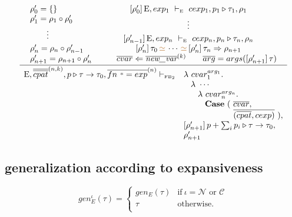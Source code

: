 \documentclass[11pt,a4paper]{article}
\newcommand{\key}[1]{\textrm{\textbf{#1}}}
\newcommand{\qualtype}[2]{#1 \triangleright #2}
\newcommand{\unifylist}[3]{#1\,{\color{brown}{\simeq}}\,\cdots\,{\color{brown}{\simeq}}\,#2 \Rightarrow #3}
\newcommand{\subst}[2]{[#1]\,#2}
\newcommand{\braced}[1]{\{#1\}}
\newcommand{\wildcard}{{\color{gray}\scriptstyle\textbf{*}}}
\newcommand{\compose}[2]{#1 \circ #2}
\newcommand{\Env}  {\textrm{E}}
\newcommand{\sFB}   {\textrm{\tiny FB}}
\newcommand{\lam}  {\mathbf\lambda}
\newcommand{\Empty}{\braced{}}
\newcommand{\vdashE}  {\ \vdash_{\textrm{\tiny E}}\  }
\newcommand{\xpc}{\mathcal{C}}
\newcommand{\nxp}{\mathcal{N}}
\newcommand{\corenew}[1]{\textit{new\_#1}}
\newcommand{\vect}[1]{\overline{#1}}
\begin{document}
\[
\cfrac
 {\begin{array}{lc}
  \rho'_0 = \Empty 
  & \subst{\rho'_0}\Env, exp_1 \vdashE cexp_1,\qualtype{p_1}{\tau_1},\rho_1 \\
  \rho'_1 = \compose{\rho_1}{\rho'_0} & \multirow{2}{*}{\vdots} \\
  \multirow{2}{*}{\qquad\vdots}  &  \\
  & \subst{\rho'_{n-1}}\Env, exp_n \vdashE cexp_n,\qualtype{p_n}{\tau_n},\rho_n \\
  \rho'_n = \compose{\rho_n}{\rho'_{n-1}}
  & \unifylist{\subst{\rho'_n}{\tau_0}}{\subst{\rho'_n}{\tau_n}}{\rho_{n+1}} \\ 
  \rho'_{n+1} = \compose{\rho_{n+1}}{\rho'_n}
  & \qquad \vect{cvar} \Leftarrow \vect{\corenew{var}}^{(k)} \qquad \vect{arg} = args(\subst{\rho'_{n+1}}{\tau}) \\
  \end{array}
 }
 {\begin{array}{ll}
  \Env,\vect{\vect{cpat}}^{(n,k)},\qualtype{p}{\tau\to\tau_0},\vect{fn\ \wildcard = exp}^{(n)} \vdash_{\sFB_2}
   & \lam\ cvar_1^{arg_1}.                      \\
   & \hspace{2ex}\lam\ \cdots                   \\
   & \hspace{4ex}\lam\ cvar_n^{arg_n}.          \\
   & \hspace{6ex}\key{Case}\ (\ \vect{cvar},    \\
   & \hspace{14ex}\vect{(\vect{cpat}, cexp)}\ ),\\
   & \subst{\rho'_{n+1}}{\qualtype{p+\sum_i p_i}{\tau\to\tau_0}}, \\
   & \rho'_{n+1} \\
  \end{array}}
\]

\subsection {generalization according to expansiveness}
\[ 
	gen_E^\iota(\tau) = \left\{\begin{array}{cl}
						gen_E(\tau)	& \textrm{if}\ \iota = \nxp \textrm{ or } \xpc \\
						\tau		& \textrm{otherwise.}				\\
						\end{array}\right.
\]
\end{document}
